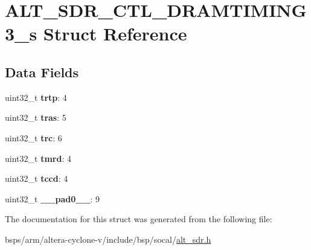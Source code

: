 \hypertarget{structALT__SDR__CTL__DRAMTIMING3__s}{}\section{A\+L\+T\+\_\+\+S\+D\+R\+\_\+\+C\+T\+L\+\_\+\+D\+R\+A\+M\+T\+I\+M\+I\+N\+G3\+\_\+s Struct Reference}
\label{structALT__SDR__CTL__DRAMTIMING3__s}
\subsection*{Data Fields}
\begin{DoxyCompactItemize}
\item 
\mbox{\label{structALT__SDR__CTL__DRAMTIMING3__s_abcf68c9aab300093bfcca4dc6b053a79}} 
uint32\+\_\+t {\bfseries trtp}\+: 4
\item 
\mbox{\label{structALT__SDR__CTL__DRAMTIMING3__s_a9c642a76da7e0d5f5f467de561bd4ee8}} 
uint32\+\_\+t {\bfseries tras}\+: 5
\item 
\mbox{\label{structALT__SDR__CTL__DRAMTIMING3__s_a138f005c396eabcb74afb8a0a1a9e6bb}} 
uint32\+\_\+t {\bfseries trc}\+: 6
\item 
\mbox{\label{structALT__SDR__CTL__DRAMTIMING3__s_ae4e2c137b71c05d190124a33ab7ed9bb}} 
uint32\+\_\+t {\bfseries tmrd}\+: 4
\item 
\mbox{\label{structALT__SDR__CTL__DRAMTIMING3__s_a227f6276bc8168eafad4af1c4e92b33e}} 
uint32\+\_\+t {\bfseries tccd}\+: 4
\item 
\mbox{\label{structALT__SDR__CTL__DRAMTIMING3__s_a9cb1d5e050ebf283df368373b5f53969}} 
uint32\+\_\+t {\bfseries \+\_\+\+\_\+pad0\+\_\+\+\_\+}\+: 9
\end{DoxyCompactItemize}


The documentation for this struct was generated from the following file\+:\begin{DoxyCompactItemize}
\item 
bsps/arm/altera-\/cyclone-\/v/include/bsp/socal/\mbox{\hyperlink{alt__sdr_8h}{alt\+\_\+sdr.\+h}}\end{DoxyCompactItemize}
